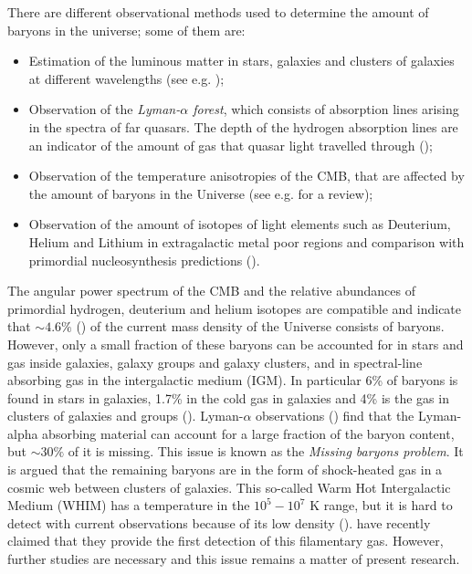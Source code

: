 There are different observational methods used to determine the amount of baryons in the universe; some of them are:
\begin{itemize}
\item Estimation of the luminous matter in stars, galaxies and clusters of galaxies at different wavelengths (see e.g. \citealt{Fukugita98}); 
\item Observation of the \emph{Lyman-$\alpha$ forest}, which consists of absorption lines arising in the spectra of far quasars. The depth of the hydrogen absorption lines are an indicator of the amount of gas that quasar light travelled through (\citealt{Rauch});
\item Observation of the temperature anisotropies of the CMB, that are affected by the amount of baryons in the Universe (see e.g. \citealt{2013IAUS..288...42C} for a review);
\item Observation of the amount of isotopes of light elements such as Deuterium, Helium and Lithium in extragalactic metal poor regions and comparison with primordial nucleosynthesis predictions (\citealt{2007MNRAS.378..576S}).
\end{itemize}
The angular power spectrum of the CMB and the relative abundances of primordial hydrogen, deuterium and helium isotopes are compatible and indicate that $\sim4.6\%$ (\citealt{planck16}) of the current mass density of the Universe consists of baryons. However, only a small fraction of these baryons can be accounted for in stars and gas inside galaxies, galaxy groups and galaxy clusters, and in spectral-line absorbing gas in the intergalactic medium (IGM). In particular 6\% of baryons is found in stars in galaxies, 1.7\% in the cold gas in galaxies and 4\% is the gas in clusters of galaxies and groups (\citealt{Fukugita}). Lyman-$\alpha$ observations (\citealt{shull}) find that the Lyman-alpha absorbing material can account for a large fraction of the baryon content, but $\sim 30\%$ of it is missing. This issue is known as the \emph{Missing baryons problem}. It is argued that the remaining baryons are in the form of shock-heated gas in a cosmic web between clusters of galaxies. This so-called Warm Hot Intergalactic Medium (WHIM) has a temperature in the $10^5 - 10^7$ K range, but it is hard to detect with current observations because of its low density (\citealt{cen}). \citet{2017arXiv170905024T} have recently claimed that they provide the first detection of this filamentary gas. 
However, further studies are necessary and this issue remains a matter of present research.


